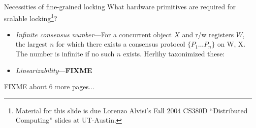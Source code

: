 \documentclass[mathserif,xcolor={dvipsnames,table}]{beamer}
\begin{document}
\begin{frame}{Necessities of fine-grained locking}
What hardware primitives are required for scalable locking\footnote{Material for this slide is due Lorenzo Alvisi's Fall 2004 CS380D ``Distributed Computing'' slides at UT-Austin.}?
\vfill
\begin{itemize}
\item \textit{Infinite consensus number}---For a concurrent object $X$ and
r/w registers $W$, the largest $n$ for which there exists
a consensus protocol $\{P_1\ldots P_n\}$ on {W, X}. The number is infinite if no
such $n$ exists. Herlihy taxonimized these:
\begin{center}
\end{center}
\item \textit{Linearizability}---\textbf{FIXME}
\end{itemize}
\end{frame}

\begin{frame}
\huge FIXME about 6 more pages...
\end{frame}
\end{document}
